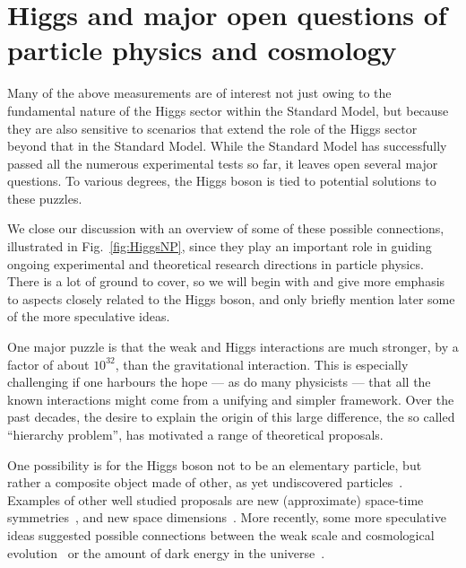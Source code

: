 \documentclass{article}
\begin{document}
\section*{Higgs and major open questions of particle physics and cosmology}

Many of the above measurements are of interest not just owing to the fundamental nature of the
Higgs sector within the Standard Model, but because they
are also sensitive to scenarios that extend the role of the Higgs
sector beyond that in the Standard Model.
%
While the Standard Model has successfully passed 
all the numerous experimental tests so far, it leaves open
several major questions.
%
%
To various degrees, the Higgs boson is tied to potential solutions
to these puzzles.

We close our discussion with an overview of some of these
possible connections, illustrated in Fig.~\ref{fig:HiggsNP}, 
%
since they play an important role in guiding ongoing experimental and
theoretical research directions in particle physics.
There is a lot of ground to cover, so we will begin with and give more emphasis to aspects closely related to the Higgs boson, and only briefly mention later some of the more speculative ideas.

One major puzzle is that the weak and Higgs interactions are
much stronger, by a factor of about $10^{32}$, than the gravitational
interaction.
%
This is especially challenging if one harbours the hope --- as do many
physicists --- that all the known interactions might come from a
unifying and simpler framework.
%
Over the past 
decades, the desire to explain the origin of
this large difference, the so called ``hierarchy problem'', has
motivated a range of theoretical proposals.

One possibility is for the Higgs boson not to be an elementary particle, but rather a composite object made of other, as yet undiscovered
particles~\cite{Kaplan:1983fs}.
%
Examples of other well studied proposals are
new (approximate) space-time
symmetries~\cite{Fayet:1976et,Fayet:1977yc,Dimopoulos:1981zb}, and new
space
dimensions~\cite{Arkani-Hamed:1998jmv,Antoniadis:1998ig,Randall:1999ee,Randall:1999vf}. More recently, some more speculative ideas suggested possible connections between the weak scale and cosmological
evolution~\cite{Graham:2015cka,Arkani-Hamed:2016rle,Giudice:2021viw} or the amount of
dark energy in the
universe~\cite{Arvanitaki:2016xds,Arkani-Hamed:2020yna}.
\end{document}

